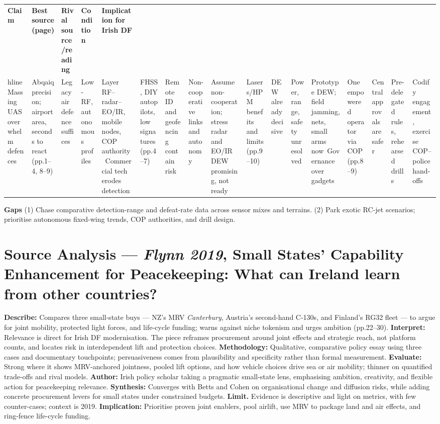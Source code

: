 \usepackage{array}
\begin{tabular}{p{3.2cm}p{4.2cm}p{3.6cm}p{3.2cm}p{4.2cm}}
	\textbf{Claim} & \textbf{Best source (page)} & \textbf{Rival source/reading} & \textbf{Condition} & \textbf{Implication for Irish DF}\\hline
	Massing UAS overwhelm defences & Abqaiq precision; airport area, seconds to react (pp.1–4, 8–9) & Legacy air defence suffices & Low-RF, autonomous profiles & Layer RF–radar–EO/IR, mobile nodes, COP authority\
	Commercial tech erodes detection & FHSS, DIY autopilots, low signatures (pp.4–7) & Remote ID and geofencing contain risk & Non-cooperative links and autonomy & Assume non-cooperation; stress radar and EO/IR\
	DEW promising, not ready & Lasers/HPM benefits and limits (pp.9–10) & DEW already decisive & Power, range, safety unresolved & Prototype DEW; field jamming, nets, small arms now\
	Governance over gadgets & One empowered operator via COP (pp.8–9) & Central approvals are safer & Pre-delegated rules, rehearsed drills & Codify engagement, exercise COP–police hand-offs\
\end{tabular}


\textbf{Gaps}
(1) Chase comparative detection-range and defeat-rate data across sensor mixes and terrains.
(2) Park exotic RC-jet scenarios; prioritise autonomous fixed-wing trends, COP authorities, and drill design.

\parencite{FLYNN_2019}
\section*{Source Analysis — \textit{Flynn 2019}, Small States’ Capability Enhancement for Peacekeeping: What can Ireland learn from other countries?}
\textbf{Describe:} Compares three small-state buys — NZ’s MRV \textit{Canterbury}, Austria’s second-hand C-130s, and Finland’s RG32 fleet — to argue for joint mobility, protected light forces, and life-cycle funding; warns against niche tokenism and urges ambition (pp.22–30).
\textbf{Interpret:} Relevance is direct for Irish DF modernisation. The piece reframes procurement around joint effects and strategic reach, not platform counts, and locates risk in interdependent lift and protection choices.
\textbf{Methodology:} Qualitative, comparative policy essay using three cases and documentary touchpoints; persuasiveness comes from plausibility and specificity rather than formal measurement.
\textbf{Evaluate:} Strong where it shows MRV-anchored jointness, pooled lift options, and how vehicle choices drive sea or air mobility; thinner on quantified trade-offs and rival models.
\textbf{Author:} Irish policy scholar taking a pragmatic small-state lens, emphasising ambition, creativity, and flexible action for peacekeeping relevance.
\textbf{Synthesis:} Converges with Betts and Cohen on organisational change and diffusion risks, while adding concrete procurement levers for small states under constrained budgets.
\textbf{Limit.} Evidence is descriptive and light on metrics, with few counter-cases; context is 2019.
\textbf{Implication:} Prioritise proven joint enablers, pool airlift, use MRV to package land and air effects, and ring-fence life-cycle funding.

